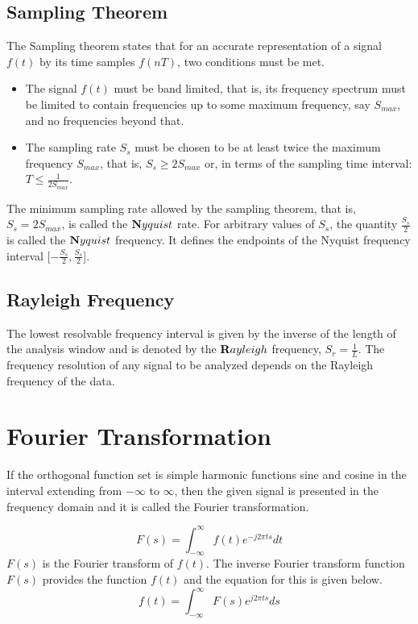 \subsection{Sampling Theorem}
The Sampling theorem states that for an accurate representation of a signal $f(t)$ by its time samples $f(nT)$, two conditions must be met. 
\begin{itemize}
  \item  {The signal $f(t)$ must be band limited, that is, its frequency spectrum must be limited to contain frequencies up to some maximum frequency, say $S_{max}$, and no frequencies beyond that.}
  \item  {The sampling rate $S_s$ must be chosen to be at least twice the maximum frequency $S_{max}$, that is, $S_s \ge 2 S_{max}$ or, in terms of the sampling time interval: $T \le \frac{1}{2S_{max}}$.}
\end{itemize}

The minimum sampling rate allowed by the sampling theorem, that is, $S_s = 2S_{max}$, is called the $\textbf Nyquist$ rate. For arbitrary values of $S_s$, the quantity $\frac{S_s}{2}$ is called the $\textbf Nyquist$ frequency. It defines the endpoints of the Nyquist frequency interval [$-\frac{S_s}{2},\frac{S_s}{2}$]. 

\subsection{Rayleigh Frequency}
The lowest resolvable frequency interval is given by the inverse of the length of the analysis window and is denoted by the $\textbf Rayleigh$ frequency, $S_r = \frac{1}{L}$. The frequency resolution of any signal to be analyzed depends on the Rayleigh frequency of the data. 

\section{Fourier Transformation}
If the orthogonal function set is simple harmonic functions sine and cosine in the interval extending from ${-\infty}$ to ${\infty}$, then the given signal is presented in the frequency domain and it is called the Fourier transformation.


\begin{equation}
F(s) = \int_{-\infty}^{\infty}{f(t)e^{-j2\pi ts}dt}
\end{equation}
$F(s)$ is the Fourier transform of $f(t)$. The inverse Fourier transform function $F(s)$ provides the function $f(t)$ and the equation for this is given below.
\begin{equation}
f(t) = \int_{-\infty}^{\infty}{F(s)e^{j2\pi ts}ds}
\end{equation}

